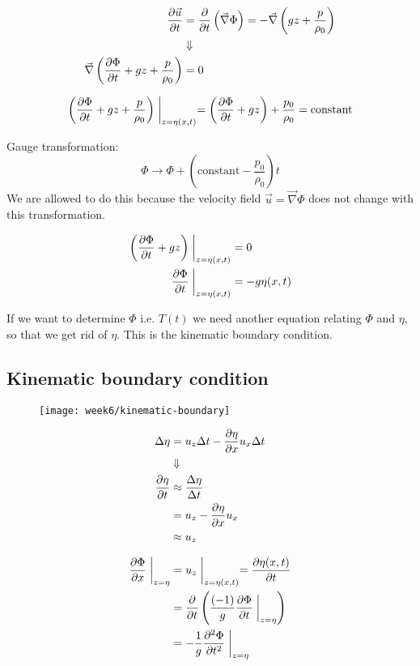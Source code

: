 \begin{align}
\frac{\partial \vec{u}}{\partial t} &= \frac{\partial }{\partial t}\left(\vec{\nabla}\Phi\right) = -\vec{\nabla}\left(gz+\frac{p}{\rho_0}\right) \\
&\Downarrow\notag\\
\vec{\nabla}\left(\frac{\partial \Phi}{\partial t}+gz+\frac{p}{\rho_0}\right)&=0
\end{align}

\begin{align}
\left(\frac{\partial \Phi}{\partial t}+gz+\frac{p}{\rho_0}\right)\biggm\vert_{z=\eta(x,t)} = \left(\frac{\partial \Phi}{\partial t}+gz\right) + \frac{p_0}{\rho_0} = \mathrm{constant}
\end{align}

Gauge transformation:
\begin{equation}
\Phi \rightarrow \Phi + \left(\mathrm{constant}-\frac{p_0}{\rho_0}\right)t
\end{equation}
We are allowed to do this because the velocity field $\vec{u}=\vec{\nabla}\Phi$ does not change with this transformation.

\begin{align}
\left(\frac{\partial \Phi}{\partial t}+gz\right)\biggm\vert_{z=\eta(x,t)}&=0\\
\frac{\partial \Phi}{\partial t}\biggm\vert_{z=\eta(x,t)} &= -g\eta(x,t)\label{eq:surface-phi-eta}
\end{align}

If we want to determine $\Phi$ i.e. $T(t)$ we need another equation relating $\Phi$ and $\eta$, so that we get rid of $\eta$. This is the kinematic boundary condition.

\newpage
\subsection{Kinematic boundary condition}

\begin{figure}[!h]
    \centering
    \texttt{[image: week6/kinematic-boundary]}\\
    \caption{}
    \label{fig:kinematic-boundary}
\end{figure}

\begin{align}
\Delta \eta &= u_z\Delta t-\frac{\partial \eta}{\partial x}u_x\Delta t\\
&\Downarrow\notag\\
\frac{\partial \eta}{\partial t}&\approx\frac{\Delta \eta}{\Delta t}\\
&= u_z-\frac{\partial \eta}{\partial x}u_x\\
&\approx u_z
\end{align}

\begin{align}
\frac{\partial \Phi}{\partial x}\biggm\vert_{z=\eta} &= u_z\biggm\vert_{z=\eta(x,t)} = \frac{\partial \eta(x,t)}{\partial t} \\
&= \frac{\partial }{\partial t}\left(\frac{(-1)}{g}\frac{\partial \Phi}{\partial t}\biggm\vert_{z=\eta}\right) \\
&= -\frac{1}{g}\frac{\partial^2 \Phi}{\partial t^2}\biggm\vert_{z=\eta}
\end{align}

